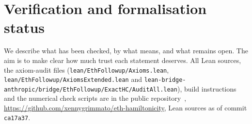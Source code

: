 \documentclass[11pt]{amsart}
\theoremstyle{plain}
\theoremstyle{definition}
\theoremstyle{remark}
\numberwithin{equation}{section}
\begin{document}
\section{Verification and formalisation status}\label{sec:verification}

We describe what has been checked, by what means, and what remains open. The aim is to make
clear how much trust each statement deserves. All Lean sources, the axiom-audit files
(\texttt{lean/EthFollowup/Axioms.lean}, \texttt{lean/EthFollowup/AxiomsExtended.lean} and
\texttt{lean-bridge-anthropic/bridge/EthFollowup/ExactHC/AuditAll.lean}), build instructions and the
numerical check scripts are in the public repository~\cite{TulsyanRepo26},
\url{https://github.com/xennygrimmato/eth-hamiltonicity}, Lean sources as of commit \texttt{ca17a37}.
\end{document}
